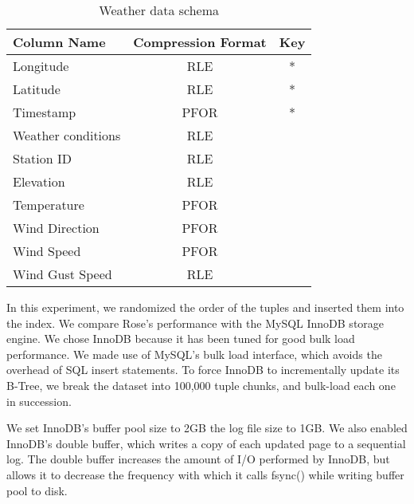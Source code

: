 \documentclass{vldb}
\newcommand{\rows}{Rose\xspace}
\newcommand{\rowss}{Rose's\xspace}
\begin{document}
\begin{table}
\caption{Weather data schema}
\centering
\label{tab:schema}
\begin{tabular}{|l|c|c|} \hline
Column Name     & Compression Format &  Key \\ \hline
Longitude       & RLE       & *       \\ \hline
Latitude        & RLE       & *       \\\hline
Timestamp       & PFOR       & *       \\\hline
Weather conditions& RLE       &        \\\hline
Station ID        & RLE       &        \\\hline
Elevation        & RLE       &        \\\hline
Temperature      & PFOR       &        \\\hline
Wind Direction        & PFOR       &        \\\hline
Wind Speed        & PFOR       &        \\\hline
Wind Gust Speed   & RLE       &        \\
\hline\end{tabular}
\end{table}
In this experiment, we randomized the order of the tuples and
inserted them into the index.  We compare \rowss performance with the
MySQL InnoDB storage engine.  We chose InnoDB because it
has been tuned for good bulk load performance.
We made use of MySQL's bulk load interface, which avoids the overhead of SQL insert
statements.  To force InnoDB to incrementally update its B-Tree, we
break the dataset into 100,000 tuple chunks, and bulk-load each one in
succession.


We set InnoDB's buffer pool size to 2GB the log file size to 1GB.  We
also enabled InnoDB's double buffer, which writes a copy of each
updated page to a sequential log.  The double buffer increases the
amount of I/O performed by InnoDB, but allows it to decrease the
frequency with which it calls fsync() while writing buffer pool to disk.
\end{document}
